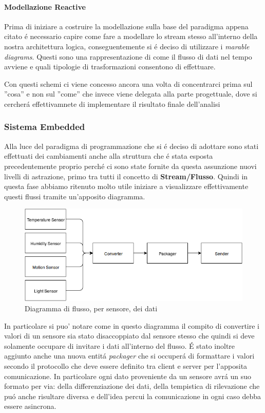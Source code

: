 \paragraph{Modellazione Reactive}

Prima di iniziare a costruire la modellazione sulla base del paradigma appena citato \'e necessario capire come fare a modellare lo stream stesso all'interno della nostra architettura logica, conseguentemente si \'e deciso di utilizzare i \textit{marable diagrams}. Questi sono una rappresentazione di come il flusso di dati nel tempo avviene e quali tipologie di trasformazioni consentono di effettuare.

Con questi schemi ci viene concesso ancora una volta di concentrarci prima sul ''cosa'' e non sul ''come'' che invece viene delegata alla parte progettuale, dove si cercher\'a effettivamnete di implementare il risultato finale dell'analisi

\subsubsection{Sistema Embedded}

Alla luce del paradigma di programmazione che si \'e deciso di adottare sono stati effettuati dei cambiamenti anche alla struttura che \'e stata esposta precedentemente proprio perch\'e ci sono state fornite da questa assunzione nuovi livelli di astrazione, primo tra tutti il concetto di \textbf{Stream/Flusso}. Quindi in questa fase abbiamo ritenuto molto utile iniziare a visualizzare effettivamente questi flussi tramite un'apposito diagramma.

\begin{figure}[ht]
\centering
\includegraphics[width=\textwidth]{Figures/LogicArchitecture/EmbeddedSystem/FlowDiagram}
\caption{Diagramma di flusso, per sensore, dei dati}
\end{figure}


In particolare si puo' notare come in questo diagramma il compito di convertire i valori di un sensore sia stato disaccoppiato dal sensore stesso che quindi si deve solamente occupare di invitare i dati all'interno del flusso. \'E stato inoltre aggiunto anche una nuova entit\'a \textit{packager} che si occuper\'a di formattare i valori secondo il protocollo che deve essere definito tra client e server per l'apposita comunicazione. In particolare ogni dato proveniente da un sensore avr\'a un suo formato per via: della differenziazione dei dati, della tempistica di rilevazione che pu\'o anche risultare diversa e dell'idea percui la comunicazione in ogni caso debba essere asincrona.

